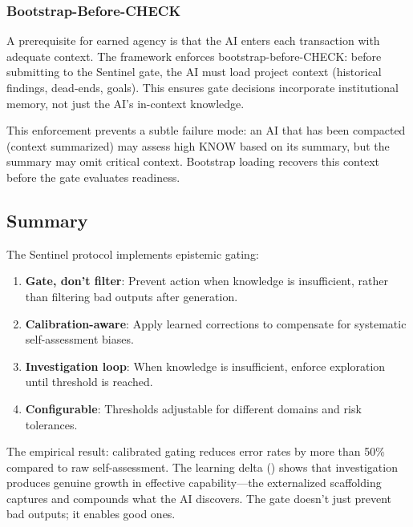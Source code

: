 \subsubsection{Bootstrap-Before-CHECK}

A prerequisite for earned agency is that the AI enters each transaction with adequate context. The framework enforces bootstrap-before-CHECK: before submitting to the Sentinel gate, the AI must load project context (historical findings, dead-ends, goals). This ensures gate decisions incorporate institutional memory, not just the AI's in-context knowledge.

This enforcement prevents a subtle failure mode: an AI that has been compacted (context summarized) may assess high KNOW based on its summary, but the summary may omit critical context. Bootstrap loading recovers this context before the gate evaluates readiness.

\subsection{Summary}

The Sentinel protocol implements epistemic gating:

\begin{enumerate}
    \item \textbf{Gate, don't filter}: Prevent action when knowledge is insufficient, rather than filtering bad outputs after generation.

    \item \textbf{Calibration-aware}: Apply learned corrections to compensate for systematic self-assessment biases.

    \item \textbf{Investigation loop}: When knowledge is insufficient, enforce exploration until threshold is reached.

    \item \textbf{Configurable}: Thresholds adjustable for different domains and risk tolerances.
\end{enumerate}

The empirical result: calibrated gating reduces error rates by more than 50\% compared to raw self-assessment. The learning delta () shows that investigation produces genuine growth in effective capability---the externalized scaffolding captures and compounds what the AI discovers. The gate doesn't just prevent bad outputs; it enables good ones.
